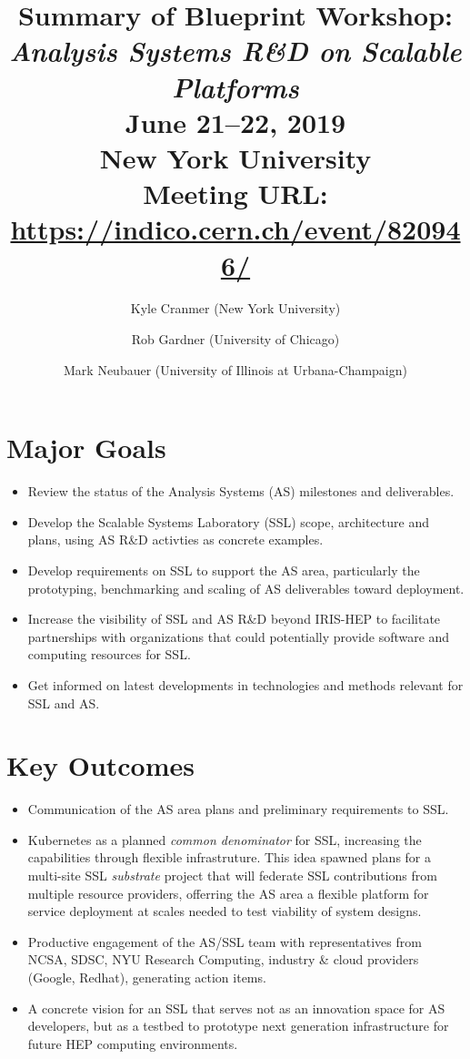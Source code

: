 \documentclass[11pt,letterpaper,fleqn]{article}
\date{} %
\title{\large Summary of Blueprint Workshop: \\
\vspace{1pt}
\LARGE \textit{Analysis Systems R\&D on Scalable Platforms} \\
\color{black} \normalsize
\vspace{10pt}
June 21--22, 2019 \\
New York University \\
Meeting URL: \href{https://indico.cern.ch/event/820946/}{https://indico.cern.ch/event/820946/}
} %
\author{Kyle Cranmer {\normalfont(New York University)}
      \and  Rob Gardner {\normalfont(University of Chicago)}
      \and  Mark Neubauer {\normalfont(University of Illinois at Urbana-Champaign)}
      }
\begin{document}
\maketitle %
\normalfont

\thispagestyle{firststyle}

\vspace{-45pt}

\section*{Major Goals}
\vspace{3pt}
\begin{itemize}
  \item Review the status of the Analysis Systems (AS) milestones and deliverables.
  \item Develop the Scalable Systems Laboratory (SSL) scope, architecture and plans, using AS R\&D activties as concrete examples.
  \item Develop requirements on SSL to support the AS area, particularly the prototyping, benchmarking and scaling of AS deliverables toward deployment.
  \item Increase the visibility of SSL and AS R\&D beyond IRIS-HEP to facilitate partnerships with organizations that could potentially provide software and computing resources for SSL.
  \item Get informed on latest developments in technologies and methods relevant for SSL and AS.
\end{itemize}

\section*{Key Outcomes}
\vspace{3pt}
\begin{itemize}
  \item Communication of the AS area plans and preliminary requirements to SSL.
  \item Kubernetes as a planned {\it common denominator} for SSL, increasing the capabilities through flexible infrastruture. This idea spawned plans for a multi-site SSL {\it substrate} project that will federate SSL contributions from multiple resource providers, offerring the AS area a flexible platform for service deployment at scales needed to test viability of system designs.
  \item Productive engagement of the AS/SSL team with representatives from NCSA, SDSC, NYU Research Computing, industry \& cloud providers (Google, Redhat), generating action items.
  \item A concrete vision for an SSL that serves not as an innovation space for AS developers, but as a testbed to prototype next generation infrastructure for future HEP computing environments.

\end{itemize}
\end{document}
